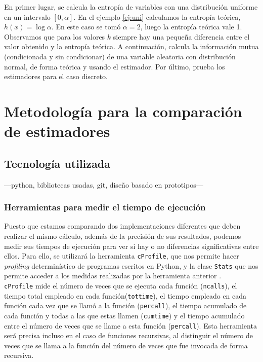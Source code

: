\documentclass[12pt,a4paper]{report} %
\theoremstyle{definition}
\begin{document}
En primer lugar, se calcula la entropía de variables con una distribución uniforme en un intervalo $[0,\alpha]$. En el ejemplo \ref{ej:uni} calculamos la entropía teórica, $h(x) = \log \alpha$. En este caso se tomó $\alpha = 2$, luego la entropía teórica vale 1. Observamos que para los valores $k$ siempre hay una pequeña diferencia entre el valor obtenido y la entropía teórica. A continuación, calcula la información mutua (condicionada y sin condicionar) de una variable aleatoria con distribución normal, de forma teórica y usando el estimador. Por último, prueba los estimadores para el caso discreto. 


\chapter{Metodología para la comparación de estimadores}
\section{Tecnología utilizada}
---python, bibliotecas usadas, git, diseño basado en prototipos---

\subsection{Herramientas para medir el tiempo de ejecución}

Puesto que estamos comparando dos implementaciones diferentes que deben realizar el mismo cálculo, además de la precisión de sus resultados, podemos medir sus tiempos de ejecución para ver si hay o no diferencias significativas entre ellos. Para ello, se utilizará la herramienta \texttt{cProfile}, que nos permite hacer \textit{profiling} determinístico de programas escritos en Python, y la clase \texttt{Stats} que nos permite acceder a los medidas realizadas por la herramienta anterior \cite{profilers}.\\

\texttt{cProfile} mide el número de veces que se ejecuta cada función (\texttt{ncalls}), el tiempo total empleado en cada función(\texttt{tottime}), el tiempo empleado en cada función cada vez que se llamó a la función (\texttt{percall}), el tiempo acumulado de cada función y todas a las que estas llamen (\texttt{cumtime}) y el tiempo acumulado entre el número de veces que se llame a esta función (\texttt{percall}). Esta herramienta será precisa incluso en el caso de funciones recursivas, al distinguir el número de veces que se llama a la función del número de veces que fue invocada de forma recursiva.\\
\end{document}
